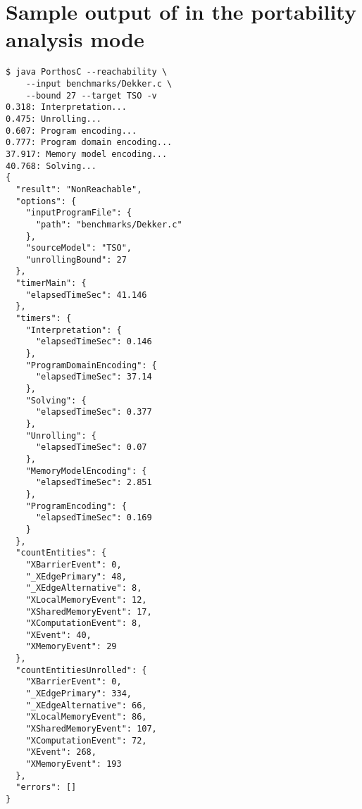 \section{Sample output of \porthos[2] in the portability analysis mode}
\label{apx:output}
\setlength{\columnsep}{1.5cm}

\begin{multicols*}{2}
\centering
\begin{lstlisting}[basicstyle=\footnotesize\ttfamily]
$ java PorthosC --reachability \ 
    --input benchmarks/Dekker.c \
    --bound 27 --target TSO -v
0.318: Interpretation...
0.475: Unrolling...
0.607: Program encoding...
0.777: Program domain encoding...
37.917: Memory model encoding...
40.768: Solving...
{
  "result": "NonReachable",
  "options": {
    "inputProgramFile": {
      "path": "benchmarks/Dekker.c"
    },
    "sourceModel": "TSO",
    "unrollingBound": 27
  },
  "timerMain": {
    "elapsedTimeSec": 41.146
  },
  "timers": {
    "Interpretation": {
      "elapsedTimeSec": 0.146
    },
    "ProgramDomainEncoding": {
      "elapsedTimeSec": 37.14
    },
    "Solving": {
      "elapsedTimeSec": 0.377
    },
    "Unrolling": {
      "elapsedTimeSec": 0.07
    },
    "MemoryModelEncoding": {
      "elapsedTimeSec": 2.851
    },
    "ProgramEncoding": {
      "elapsedTimeSec": 0.169
    }
  },
  "countEntities": {
    "XBarrierEvent": 0,
    "_XEdgePrimary": 48,
    "_XEdgeAlternative": 8,
    "XLocalMemoryEvent": 12,
    "XSharedMemoryEvent": 17,
    "XComputationEvent": 8,
    "XEvent": 40,
    "XMemoryEvent": 29
  },
  "countEntitiesUnrolled": {
    "XBarrierEvent": 0,
    "_XEdgePrimary": 334,
    "_XEdgeAlternative": 66,
    "XLocalMemoryEvent": 86,
    "XSharedMemoryEvent": 107,
    "XComputationEvent": 72,
    "XEvent": 268,
    "XMemoryEvent": 193
  },
  "errors": []
}
\end{lstlisting}
\end{multicols*}


%
